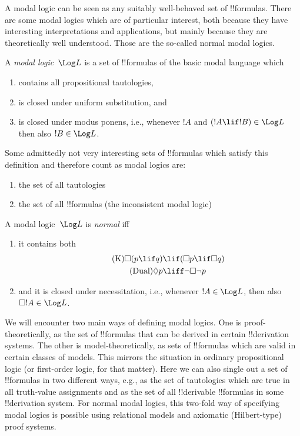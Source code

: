 \documentclass[../../../include/open-logic-section]{subfiles}
\begin{document}

A modal logic can be seen as any suitably well-behaved set of
!!{formula}s.  There are some modal logics which are of particular
interest, both because they have interesting interpretations and
applications, but mainly because they are theoretically well
understood.  Those are the so-called normal modal logics.

\begin{defn}
A \emph{modal logic}~$\Log L$ is a set of !!{formula}s of the basic
modal language which 
\begin{enumerate}
\item contains all propositional tautologies, 
\item is closed under uniform substitution, and 
\item is closed under modus ponens, i.e., whenever $!A$ and $(!A \lif
  !B) \in \Log L$ then also $!B \in \Log L$.
\end{enumerate}
\end{defn}

\begin{ex}
Some admittedly not very interesting sets of !!{formula}s which
satisfy this definition and therefore count as modal logics are:
\begin{enumerate}
\item the set of all tautologies
\item the set of all !!{formula}s (the inconsistent modal logic)
\end{enumerate}
\end{ex}

\begin{defn}\label{defn:normal-modal-logic}
A modal logic~$\Log L$ is \emph{normal} iff 
\begin{enumerate}
\item it contains both
\begin{align}
\tag{K} \Box(p \lif q) & \lif (\Box p \lif \Box q) \\
\tag{Dual} \Diamond p & \liff \lnot \Box \lnot p
\end{align}
\item and it is closed under necessitation, i.e., whenever $!A \in
  \Log L$, then also $\Box !A \in \Log L$.
\end{enumerate}
\end{defn}

We will encounter two main ways of defining modal logics.  One is
proof-theoretically, as the set of !!{formula}s that can be derived in
certain !!{derivation} systems. The other is model-theoretically, as
sets of !!{formula}s which are valid in certain classes of
models. This mirrors the situation in ordinary propositional logic (or
first-order logic, for that matter).  Here we can also single out a
set of !!{formula}s in two different ways, e.g., as the set of
tautologies which are true in all truth-value assignments and as the
set of all !!{derivable} !!{formula}s in some !!{derivation} system.
For normal modal logics, this two-fold way of specifying modal logics
is possible using relational models and axiomatic (Hilbert-type) proof
systems.
\end{document}
